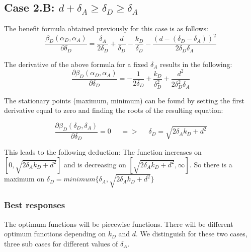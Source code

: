 \subsection*{Case 2.B: $d+\delta_{A} \geq \delta_{D} \geq  \delta_{A} $} 

The benefit formula obtained previously for this case is as follows:
\begin{equation*}
\dfrac{\beta_{D}(\alpha_{D},\alpha_{A})}{\partial \delta_{D}} = \dfrac{\delta_{A}}{2\delta_{D}} + \dfrac{d}{\delta_{D}} - \dfrac{k_{D}}{\delta_{D}} - \dfrac{(d-(\delta_{D} - \delta_{A}))^{2}}{2\delta_{D}\delta_{A}}
\end{equation*}

The derivative of the above formula for a fixed $\delta_{A}$ results in the following:
\begin{equation*}
\frac{\partial \beta_{D}(\alpha_{D},\alpha_{A})}{\partial \delta_{D}} =  - \dfrac{1}{2\delta_{D}} + \dfrac{k_{D}}{\delta_{D}^{2}} + \dfrac{d^{2}}{2\delta_{D}^{2}\delta_{A}}
\end{equation*}


The stationary points (maximum, minimum) can be found by setting the first derivative equal to zero and finding the roots of the resulting equation:

\begin{equation*}
\frac{\partial \beta_{D}(\delta_{D},\delta_{A})}{\partial \delta_{D}} =0 ~~~~~~ =>~~~~~~ \delta_{D} = \sqrt{2\delta_{A}k_{D} + d^{2}}
\end{equation*}


This leads to the following deduction: The function increases on $[0, \sqrt{2\delta_{A}k_{D} + d^{2}}]$ and is decreasing on $[\sqrt{2\delta_{A}k_{D} + d^{2}}, \infty]$. So there is a maximum on $\delta_{D} = minimum \{ \delta_{A}, \sqrt{2\delta_{A}k_{D} + d^{2}} \} $ \\

\subsubsection{Best responses}
The optimum functions will be piecewise functions. There will be different optimum functions depending on $k_{D}$ and $d$. We distinguish for these two cases, three sub cases for different values of $\delta_{A}$. 

